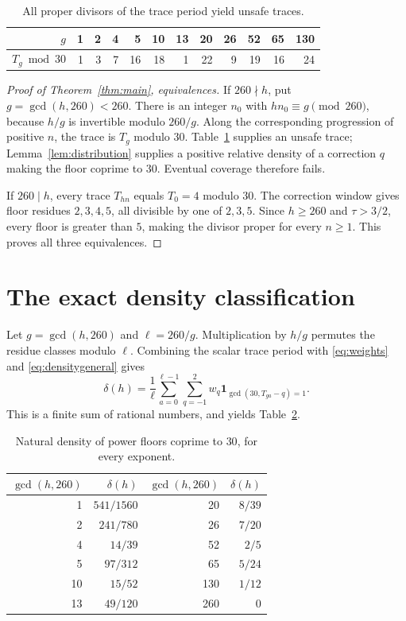 \documentclass[11pt,a4paper]{article}
\theoremstyle{definition}\newtheorem{definition}[theorem]{Definition}
\theoremstyle{remark}\newtheorem{remark}[theorem]{Remark}
\newcommand{\ind}{\mathbf 1}
\begin{document}
\begin{table}[ht]
\centering\small
\begin{tabular}{@{}r|rrrrrrrrrrr@{}}
\toprule
$g$&1&2&4&5&10&13&20&26&52&65&130\\
\midrule
$T_g\bmod30$&1&3&7&16&18&1&22&9&19&16&24\\
\bottomrule
\end{tabular}
\caption{All proper divisors of the trace period yield unsafe traces.}
\label{tab:unsafe}
\end{table}

\begin{proof}[Proof of Theorem~\ref{thm:main}, equivalences]
If $260\nmid h$, put $g=\gcd(h,260)<260$. There is an integer $n_0$ with $hn_0\equiv g\pmod{260}$, because $h/g$ is invertible modulo $260/g$. Along the corresponding progression of positive $n$, the trace is $T_g$ modulo $30$. Table~\ref{tab:unsafe} supplies an unsafe trace; Lemma~\ref{lem:distribution} supplies a positive relative density of a correction $q$ making the floor coprime to $30$. Eventual coverage therefore fails.

If $260\mid h$, every trace $T_{hn}$ equals $T_0=4$ modulo $30$. The correction window gives floor residues $2,3,4,5$, all divisible by one of $2,3,5$. Since $h\ge260$ and $\tau>3/2$, every floor is greater than $5$, making the divisor proper for every $n\ge1$. This proves all three equivalences.
\end{proof}

\section{The exact density classification}
Let $g=\gcd(h,260)$ and $\ell=260/g$. Multiplication by $h/g$ permutes the residue classes modulo $\ell$. Combining the scalar trace period with \eqref{eq:weights} and \eqref{eq:densitygeneral} gives
\begin{equation}\label{eq:densityquartic}
 \delta(h)=\frac1\ell\sum_{a=0}^{\ell-1}\sum_{q=-1}^{2}
 w_q\ind_{\gcd(30,T_{ga}-q)=1}.
\end{equation}
This is a finite sum of rational numbers, and yields Table~\ref{tab:density}.

\begin{table}[ht]
\centering
\begin{tabular}{@{}rr@{\qquad\qquad}rr@{}}
\toprule
$\gcd(h,260)$&$\delta(h)$&$\gcd(h,260)$&$\delta(h)$\\
\midrule
1&$541/1560$&20&$8/39$\\
2&$241/780$&26&$7/20$\\
4&$14/39$&52&$2/5$\\
5&$97/312$&65&$5/24$\\
10&$15/52$&130&$1/12$\\
13&$49/120$&260&$0$\\
\bottomrule
\end{tabular}
\caption{Natural density of power floors coprime to $30$, for every exponent.}
\label{tab:density}
\end{table}
\end{document}

